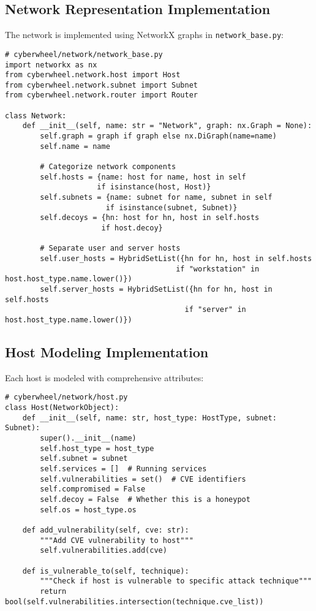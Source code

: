\documentclass[12pt,a4paper]{article}
\begin{document}
\subsection{Network Representation Implementation}
The network is implemented using NetworkX graphs in \texttt{network\_base.py}:

\begin{lstlisting}[caption=Network Base Implementation]
# cyberwheel/network/network_base.py
import networkx as nx
from cyberwheel.network.host import Host
from cyberwheel.network.subnet import Subnet
from cyberwheel.network.router import Router

class Network:
    def __init__(self, name: str = "Network", graph: nx.Graph = None):
        self.graph = graph if graph else nx.DiGraph(name=name)
        self.name = name
        
        # Categorize network components
        self.hosts = {name: host for name, host in self 
                     if isinstance(host, Host)}
        self.subnets = {name: subnet for name, subnet in self 
                       if isinstance(subnet, Subnet)}
        self.decoys = {hn: host for hn, host in self.hosts 
                      if host.decoy}
        
        # Separate user and server hosts
        self.user_hosts = HybridSetList({hn for hn, host in self.hosts 
                                       if "workstation" in host.host_type.name.lower()})
        self.server_hosts = HybridSetList({hn for hn, host in self.hosts 
                                         if "server" in host.host_type.name.lower()})
\end{lstlisting}

\subsection{Host Modeling Implementation}
Each host is modeled with comprehensive attributes:

\begin{lstlisting}[caption=Host Implementation]
# cyberwheel/network/host.py
class Host(NetworkObject):
    def __init__(self, name: str, host_type: HostType, subnet: Subnet):
        super().__init__(name)
        self.host_type = host_type
        self.subnet = subnet
        self.services = []  # Running services
        self.vulnerabilities = set()  # CVE identifiers
        self.compromised = False
        self.decoy = False  # Whether this is a honeypot
        self.os = host_type.os
        
    def add_vulnerability(self, cve: str):
        """Add CVE vulnerability to host"""
        self.vulnerabilities.add(cve)
        
    def is_vulnerable_to(self, technique):
        """Check if host is vulnerable to specific attack technique"""
        return bool(self.vulnerabilities.intersection(technique.cve_list))
\end{lstlisting}
\end{document}
